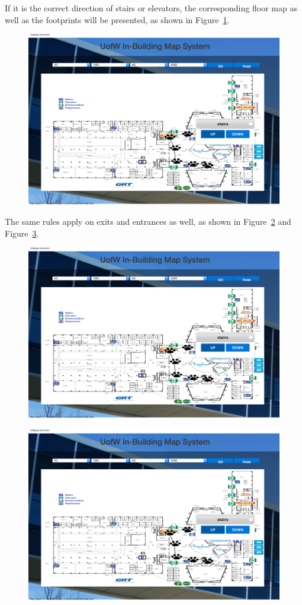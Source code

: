 \documentclass{sigchi}
\begin{document}
If it is the correct direction of stairs or elevators, the corresponding floor map as well as the footprints will be presented, as shown in Figure~\ref{fig:map9}.

\begin{figure}[!h]
\centering
\includegraphics[width=0.6\columnwidth]{pics/map9.png}
\label{fig:map9}
\end{figure}

The same rules apply on exits and entrances as well, as shown in Figure~\ref{fig:map10} and Figure~\ref{fig:map11}.

\begin{figure}[!h]
\centering
\includegraphics[width=0.6\columnwidth]{pics/map10.png}
\label{fig:map10}
\end{figure}

\begin{figure}[!h]
\centering
\includegraphics[width=0.6\columnwidth]{pics/map11.png}
\label{fig:map11}
\end{figure}
\end{document}
